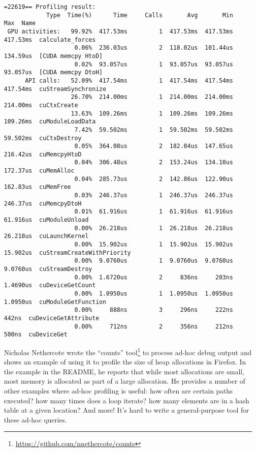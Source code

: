 {\scriptsize
\begin{verbatim}
=22619== Profiling result:
            Type  Time(%)      Time     Calls       Avg       Min       Max  Name
 GPU activities:   99.92%  417.53ms         1  417.53ms  417.53ms  417.53ms  calculate_forces
                    0.06%  236.03us         2  118.02us  101.44us  134.59us  [CUDA memcpy HtoD]
                    0.02%  93.057us         1  93.057us  93.057us  93.057us  [CUDA memcpy DtoH]
      API calls:   52.09%  417.54ms         1  417.54ms  417.54ms  417.54ms  cuStreamSynchronize
                   26.70%  214.00ms         1  214.00ms  214.00ms  214.00ms  cuCtxCreate
                   13.63%  109.26ms         1  109.26ms  109.26ms  109.26ms  cuModuleLoadData
                    7.42%  59.502ms         1  59.502ms  59.502ms  59.502ms  cuCtxDestroy
                    0.05%  364.08us         2  182.04us  147.65us  216.42us  cuMemcpyHtoD
                    0.04%  306.48us         2  153.24us  134.10us  172.37us  cuMemAlloc
                    0.04%  285.73us         2  142.86us  122.90us  162.83us  cuMemFree
                    0.03%  246.37us         1  246.37us  246.37us  246.37us  cuMemcpyDtoH
                    0.01%  61.916us         1  61.916us  61.916us  61.916us  cuModuleUnload
                    0.00%  26.218us         1  26.218us  26.218us  26.218us  cuLaunchKernel
                    0.00%  15.902us         1  15.902us  15.902us  15.902us  cuStreamCreateWithPriority
                    0.00%  9.0760us         1  9.0760us  9.0760us  9.0760us  cuStreamDestroy
                    0.00%  1.6720us         2     836ns     203ns  1.4690us  cuDeviceGetCount
                    0.00%  1.0950us         1  1.0950us  1.0950us  1.0950us  cuModuleGetFunction
                    0.00%     888ns         3     296ns     222ns     442ns  cuDeviceGetAttribute
                    0.00%     712ns         2     356ns     212ns     500ns  cuDeviceGet
\end{verbatim}
}


Nicholas Nethercote wrote the ``counts'' tool\footnote{\url{https://github.com/nnethercote/counts}} to process ad-hoc debug output and shows an example of using it to profile the size of heap allocations in Firefox. In the example in the README, he reports that while most allocations are small, most memory is allocated as part of a large allocation. He provides a number of other examples where ad-hoc profiling is useful: how often are certain paths executed? how many times does a loop iterate? how many elements are in a hash table at a given location? And more! It's hard to write a general-purpose tool for these ad-hoc queries.

